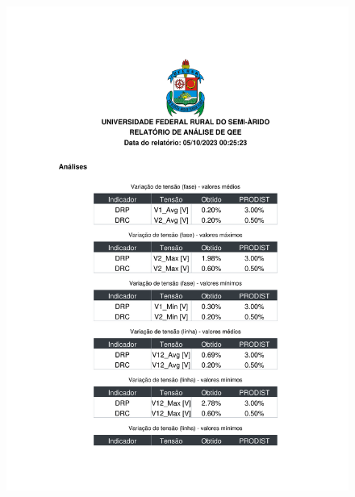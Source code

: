 \begin{figure}[H]
	\centering
  \includegraphics[height=20cm, page=2, clip]{contents/post_textual/analise_amostra_2.pdf}
\end{figure}

